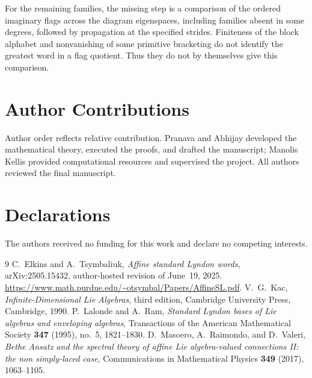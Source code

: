 \documentclass[11pt]{amsart}
\numberwithin{equation}{section}
\theoremstyle{definition}
\begin{document}
For the remaining families, the missing step is a comparison of the ordered imaginary flags across the diagram eigenspaces, including families absent in some degrees, followed by propagation at the specified strides. Finiteness of the block alphabet and nonvanishing of some primitive bracketing do not identify the greatest word in a flag quotient. Thus they do not by themselves give this comparison.

\section*{Author Contributions}
Author order reflects relative contribution. Pranava and Abhijay developed the mathematical theory, executed the proofs, and drafted the manuscript; Manolis Kellis provided computational resources and supervised the project. All authors reviewed the final manuscript.
\section*{Declarations}
The authors received no funding for this work and declare no competing interests.

\begin{thebibliography}{9}
 C.~Elkins and A.~Tsymbaliuk, \emph{Affine standard Lyndon words}, arXiv:2505.15432, author-hosted revision of June~19, 2025. \url{https://www.math.purdue.edu/~otsymbal/Papers/AffineSL.pdf}.
 V.~G.~Kac, \emph{Infinite-Dimensional Lie Algebras}, third edition, Cambridge University Press, Cambridge, 1990.
 P.~Lalonde and A.~Ram, \emph{Standard Lyndon bases of Lie algebras and enveloping algebras}, Transactions of the American Mathematical Society \textbf{347} (1995), no.~5, 1821--1830.
 D.~Masoero, A.~Raimondo, and D.~Valeri, \emph{Bethe Ansatz and the spectral theory of affine Lie algebra-valued connections II: the non simply-laced case}, Communications in Mathematical Physics \textbf{349} (2017), 1063--1105.
\end{thebibliography}
\end{document}

